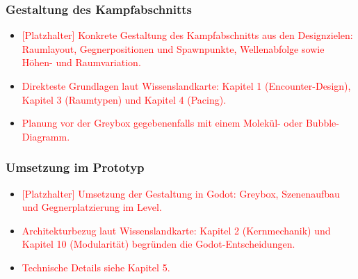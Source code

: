 \documentclass[../Main.tex]{subfiles}
\begin{document}
\subsubsection{Gestaltung des Kampfabschnitts}

\begin{itemize}[leftmargin=1.5cm]
    \item \textcolor{red}{[Platzhalter] Konkrete Gestaltung des Kampfabschnitts aus den Designzielen: Raumlayout, Gegnerpositionen und Spawnpunkte, Wellenabfolge sowie Höhen- und Raumvariation.}
    \item \textcolor{red}{Direkteste Grundlagen laut Wissenslandkarte: Kapitel 1 (Encounter-Design), Kapitel 3 (Raumtypen) und Kapitel 4 (Pacing).}
    \item \textcolor{red}{Planung vor der Greybox gegebenenfalls mit einem Molekül- oder Bubble-Diagramm.}
\end{itemize}

\subsubsection{Umsetzung im Prototyp}

\begin{itemize}[leftmargin=1.5cm]
    \item \textcolor{red}{[Platzhalter] Umsetzung der Gestaltung in Godot: Greybox, Szenenaufbau und Gegnerplatzierung im Level.}
    \item \textcolor{red}{Architekturbezug laut Wissenslandkarte: Kapitel 2 (Kernmechanik) und Kapitel 10 (Modularität) begründen die Godot-Entscheidungen.}
    \item \textcolor{red}{Technische Details siehe Kapitel 5.}

\end{itemize}
\end{document}
